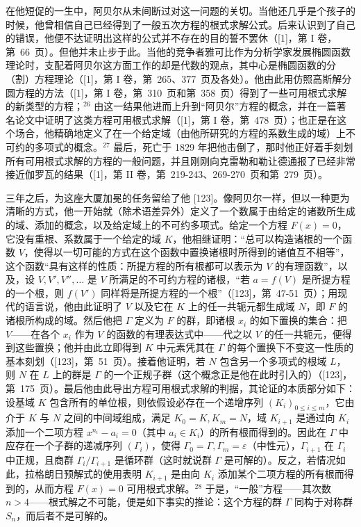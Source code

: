 在他短促的一生中，阿贝尔从未间断过对这一问题的关切。当他还几乎是个孩子的时候，他曾相信自己已经得到了一般五次方程的根式求解公式。后来认识到了自己的错误，他便不达证明出这样的公式并不存在的目的誓不罢休（{[}1{]}，第 I 卷，第~66~页）。但他并未止步于此。当他的竞争者雅可比作为分析学家发展椭圆函数理论时，支配着阿贝尔这方面工作的却是代数的观点，其中心是椭圆函数的分（割）方程理论（{[}1{]}，第 I 卷，第~265、377~页及各处）。他由此用仿照高斯解分圆方程的方法（{[}1{]}，第 I 卷，第~310~页和第~358~页）得到了一些可用根式求解的新类型的方程；\(^{26}\) 由这一结果他进而上升到“阿贝尔”方程的概念，并在一篇著名论文中证明了这类方程可用根式求解（{[}1{]}，第 I 卷，第~478~页）；也正是在这个场合，他精确地定义了在一个给定域（由他所研究的方程的系数生成的域）上不可约的多项式的概念。\(^{27}\) 最后，死亡于 1829 年把他击倒了，那时他正好着手刻划所有可用根式求解的方程的一般问题，并且刚刚向克雷勒和勒让德通报了已经非常接近伽罗瓦的结果（{[}1{]}，第 II 卷，第~219-243、269-270~页和第~279~页）。

三年之后，为这座大厦加冕的任务留给了他 {[}123{]}。像阿贝尔一样，但以一种更为清晰的方式，他一开始就（除术语差异外）定义了一个数属于由给定的诸数所生成的域、添加的概念，以及给定域上的不可约多项式。给定一个方程 \(F(x) = 0\)，它没有重根、系数属于一个给定的域 \(K\)，他相继证明：“总可以构造诸根的一个函数 \(V\)，使得以一切可能的方式在这个函数中置换诸根时所得到的诸值互不相等”，这个函数“具有这样的性质：所提方程的所有根都可以表示为 \(V\) 的有理函数”，以及，设 \(V, V', V'', \ldots\) 是 \(V\) 所满足的不可约方程的诸根，“若 \(a = f(V)\) 是所提方程的一个根，则 \(f(V')\) 同样将是所提方程的一个根”（{[}123{]}，第~47-51~页）；用现代的语言说，他由此证明了 \(V\) 以及它在 \(K\) 上的任一共轭元都生成域 \(N\)，即 \(F\) 的诸根所构成的域。然后他把 \(\Gamma\) 定义为 \(F\) 的群，即诸根 \(x_i\) 的如下置换的集合：把 \(V\)——在各个 \(x_i\) 作为 \(V\) 的函数的有理表达式中——代之以 \(V\) 的任一共轭元，便得到这些置换；他并由此立即得到 \(K\) 中元素凭其在 \(\Gamma\) 的每个置换下不变这一性质的基本刻划（{[}123{]}，第~51~页）。接着他证明，若 \(N\) 包含另一个多项式的根域 \(L\)，则 \(N\) 在 \(L\) 上的群是 \(\Gamma\) 的一个正规子群（这个概念正是他在此时引入的）（{[}123{]}，第~175~页）。最后他由此导出方程可用根式求解的判据，其论证的本质部分如下：设基域 \(K\) 包含所有的单位根，则依假设必存在一个递增序列 \((K_i)_{0 \leq i \leq m}\)，它由介于 \(K\) 与 \(N\) 之间的中间域组成，满足 \(K_0 = K, K_m = N\)，域 \(K_{i+1}\) 是通过向 \(K_i\) 添加一个二项方程 \(x^{n_i} - a_i = 0\)（其中 \(a_i \in K_i\)）的所有根而得到的。因此在 \(\Gamma\) 中应存在一个子群的递减序列 \((\Gamma_i)\)，使得 \(\Gamma_0 = \Gamma, \Gamma_m = \varepsilon\)（中性元），\(\Gamma_{i+1}\) 在 \(\Gamma_i\) 中正规，且商群 \(\Gamma_i / \Gamma_{i+1}\) 是循环群（这时就说群 \(\Gamma\) 是可解的）。反之，若情况如此，拉格朗日预解式的使用表明 \(K_{i+1}\) 是由向 \(K_i\) 添加某个二项方程的所有根而得到的，从而方程 \(F(x) = 0\) 可用根式求解。\(^{28}\) 于是，“一般”方程——其次数 \(n > 4\)——根式解之不可能，便是如下事实的推论：这个方程的群 \(\Gamma\) 同构于对称群 \(S_n\)，而后者不是可解的。

